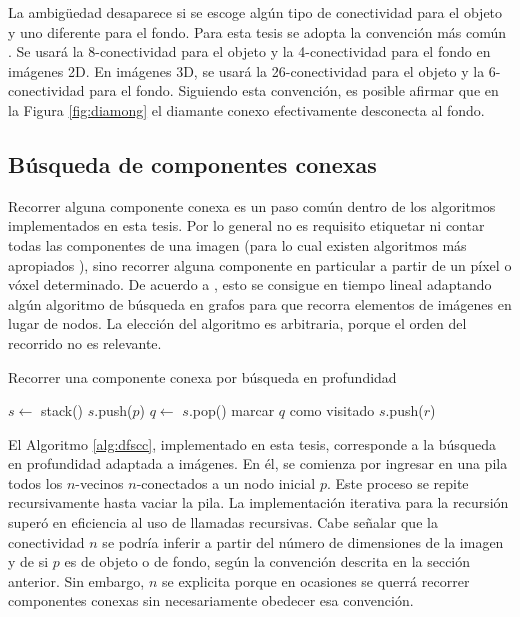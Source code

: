 La ambigüedad desaparece si se escoge algún tipo de conectividad para el objeto y uno diferente para el fondo. Para esta tesis se adopta la convención más común \cite{kong1989digital}. Se usará la 8-conectividad para el objeto y la 4-conectividad para el fondo en imágenes 2D. En imágenes 3D, se usará la 26-conectividad para el objeto y la 6-conectividad para el fondo. Siguiendo esta convención, es posible afirmar que en la Figura \ref{fig:diamong} el diamante conexo efectivamente desconecta al fondo.

\subsection{Búsqueda de componentes conexas}

Recorrer alguna componente conexa es un paso común dentro de los algoritmos implementados en esta tesis. Por lo general no es requisito etiquetar ni contar todas las componentes de una imagen (para lo cual existen algoritmos más apropiados \cite{thurfjell1992new}), sino recorrer alguna componente en particular a partir de un píxel o vóxel determinado. De acuerdo a \cite{vincent1991watersheds}, esto se consigue en tiempo lineal adaptando algún algoritmo de búsqueda en grafos para que recorra elementos de imágenes en lugar de nodos. La elección del algoritmo es arbitraria, porque el orden del recorrido no es relevante.

\begin{algorithm}
\caption{Recorrer una componente conexa por búsqueda en profundidad}
\label{alg:dfscc}
\begin{algorithmic}[1]
	\State{}
	\State $s \gets$ stack()
    \State $s$.push($p$)
		\State $q \gets$ $s$.pop()
    		\State marcar $q$ como visitado
            	 \label{valfirstuseever} 
                  \State $s$.push($r$)
                \EndIf
    		\EndFor
        \EndIf
  	\EndWhile
\EndFunction
\end{algorithmic}
\end{algorithm}

El Algoritmo \ref{alg:dfscc}, implementado en esta tesis, corresponde a la búsqueda en profundidad \cite{hopcroft1973algorithm} adaptada a imágenes. En él, se comienza por ingresar en una pila todos los $n$-vecinos $n$-conectados a un nodo inicial $p$. Este proceso se repite recursivamente hasta vaciar la pila. La implementación iterativa para la recursión superó en eficiencia al uso de llamadas recursivas. Cabe señalar que la conectividad $n$ se podría inferir a partir del número de dimensiones de la imagen y de si $p$ es de objeto o de fondo, según la convención descrita en la sección anterior. Sin embargo, $n$ se explicita porque en ocasiones se querrá recorrer componentes conexas sin necesariamente obedecer esa convención.

